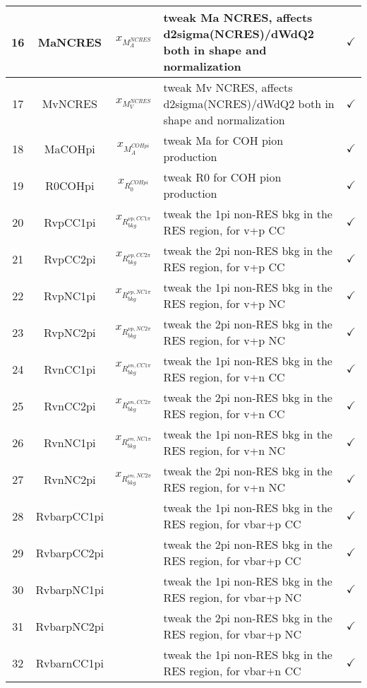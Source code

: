 \begin{longtable}{|c|c|c|X|c|}
\hline
16 & MaNCRES & $x_{M_A^{NCRES}}$ & tweak Ma NCRES, affects d2sigma(NCRES)/dWdQ2 both in shape and normalization & $\checkmark$\\
\hline
17 & MvNCRES &$x_{M_V^{NCRES}}$& tweak Mv NCRES, affects d2sigma(NCRES)/dWdQ2 both in shape and normalization & $\checkmark$\\
\hline \hline
18 & MaCOHpi &$x_{M_A^{COHpi}}$& tweak Ma for COH pion production & $\checkmark$\\
\hline
19 & R0COHpi &$x_{R_0^{COHpi}}$& tweak R0 for COH pion production & $\checkmark$\\
\hline
20 & RvpCC1pi &$x_{R_{bkg}^{\nu p,CC1\pi}}$& tweak the 1pi non-RES bkg in the RES region, for v+p CC & $\checkmark$\\
\hline
21 & RvpCC2pi &$x_{R_{bkg}^{\nu p,CC2\pi}}$& tweak the 2pi non-RES bkg in the RES region, for v+p CC & $\checkmark$\\
\hline
22 & RvpNC1pi &$x_{R_{bkg}^{\nu p,NC1\pi}}$& tweak the 1pi non-RES bkg in the RES region, for v+p NC & $\checkmark$\\
\hline
23 & RvpNC2pi &$x_{R_{bkg}^{\nu p,NC2\pi}}$& tweak the 2pi non-RES bkg in the RES region, for v+p NC & $\checkmark$\\
\hline
24 & RvnCC1pi &$x_{R_{bkg}^{\nu n,CC1\pi}}$& tweak the 1pi non-RES bkg in the RES region, for v+n CC & $\checkmark$\\
\hline
25 & RvnCC2pi &$x_{R_{bkg}^{\nu n,CC2\pi}}$& tweak the 2pi non-RES bkg in the RES region, for v+n CC & $\checkmark$\\
\hline
26 & RvnNC1pi &$x_{R_{bkg}^{\nu n,NC1\pi}}$& tweak the 1pi non-RES bkg in the RES region, for v+n NC & $\checkmark$\\
\hline
27 & RvnNC2pi &$x_{R_{bkg}^{\nu n,NC2\pi}}$& tweak the 2pi non-RES bkg in the RES region, for v+n NC & $\checkmark$\\
\hline
28 & RvbarpCC1pi && tweak the 1pi non-RES bkg in the RES region, for vbar+p CC & $\checkmark$\\
\hline
29 & RvbarpCC2pi && tweak the 2pi non-RES bkg in the RES region, for vbar+p CC & $\checkmark$\\
\hline
30 & RvbarpNC1pi && tweak the 1pi non-RES bkg in the RES region, for vbar+p NC & $\checkmark$\\
\hline
31 & RvbarpNC2pi && tweak the 2pi non-RES bkg in the RES region, for vbar+p NC & $\checkmark$\\
\hline
32 & RvbarnCC1pi && tweak the 1pi non-RES bkg in the RES region, for vbar+n CC & $\checkmark$\\

\end{longtable}
